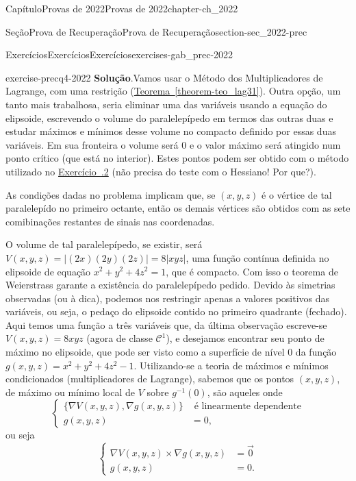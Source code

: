\documentclass[oneside,10pt,]{book}
\newcommand{\blocktitlefont}{\relax}
\newcommand{\xreffont}{\relax}
\numberwithin{equation}{section}
\newcommand{\amp}{&}
\begin{document}
\begin{chapterptx}{Capítulo}{Provas de 2022}{}{Provas de 2022}{}{}{chapter-ch_2022}
\begin{sectionptx}{Seção}{Prova de Recuperação}{}{Prova de Recuperação}{}{}{section-sec_2022-prec}
\begin{exercises-subsection-numberless}{Exercícios}{Exercícios}{}{Exercícios}{}{}{exercises-gab_prec-2022}
\begin{divisionexercise}{4}{}{}{exercise-precq4-2022}
\noindent\textbf{\blocktitlefont Solução}.\hypertarget{solution-precq4-2022-d}{}\quad{}Vamos usar o Método dos Multiplicadores de Lagrange, com uma restrição (\hyperref[theorem-teo_lag31]{Teorema~{\xreffont\ref{theorem-teo_lag31}}}). Outra opção, um tanto mais trabalhosa, seria eliminar uma das variáveis usando a equação do elipsoide, escrevendo o volume do paralelepípedo em termos das outras duas e estudar máximos e mínimos desse volume no compacto definido por essas duas variáveis. Em sua fronteira o volume será \(0\) e o valor máximo será atingido num ponto crítico (que está no interior). Estes pontos podem ser obtido com o método utilizado no \hyperlink{exercise-precq2-2022}{Exercício~{\xreffont 3.4.2}} (não precisa do teste com o Hessiano! Por que?).%
\par
As condições dadas no problema implicam que, se \((x,y,z)\) é o vértice de tal paralelepído no primeiro octante, então os demais vértices são obtidos com as sete comibinações restantes de sinais nas coordenadas.%
\par
O volume de tal paralelepípedo, se existir, será \(V(x,y,z)=|(2x)(2y)(2z)|=8|xyz|\), uma função contínua definida no elipsoide de equação \(x^2+y^2 +4z^2 =1\), que é compacto. Com isso o teorema de Weierstrass garante a existência do paralelepípedo pedido. Devido às simetrias observadas (ou à dica), podemos nos restringir apenas a valores positivos das variáveis, ou seja, o pedaço do elipsoide contido no primeiro quadrante (fechado). Aqui temos uma função a três variáveis que, da última observação escreve-se \(V(x,y,z)=8xyz\) (agora de classe \(\mathscr{C}^1\)), e desejamos encontrar seu ponto de máximo no elipsoide, que pode ser visto como a superfície de nível \(0\) da função \(g(x,y,z)=x^2+y^2+4z^2-1\). Utilizando-se a teoria de máximos e mínimos condicionados (multiplicadores de Lagrange), sabemos que os pontos \((x,y,z)\), de máximo ou mínimo local de \(V\) sobre \(g^{-1}(0)\), são aqueles onde%
\begin{equation*}
\begin{cases} \big\{\nabla V(x,y,z),\nabla
g(x,y,z)\big\}\amp\text{ é linearmente dependente}\\
g(x,y,z)\amp=0, \end{cases}
\end{equation*}
ou seja%
\begin{equation*}
\begin{cases}
\nabla V(x,y,z)\times\nabla g(x,y,z)\amp =\vec{0}\\ g(x,y,z)\amp
=0.  \end{cases}

\end{equation*}
\end{divisionexercise}
\end{exercises-subsection-numberless}
\end{sectionptx}
\end{chapterptx}
\end{document}

